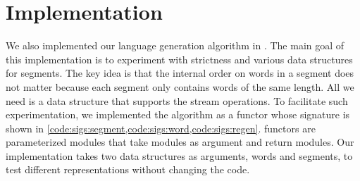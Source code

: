 \section{\ocaml Implementation}
\label{sec:ocaml}

\lstset{language=[Objective]Caml}

We also implemented our
language generation algorithm in \ocaml.
The main goal of this implementation is to experiment with strictness
and various data structures for segments. 
The key idea is that the internal order on words in a segment does not matter
because each segment only contains words of the same length.
All we need is a data structure that supports the stream
operations.
%
To facilitate such experimentation, we implemented the
algorithm as a functor whose signature is shown in
\cref{code:sigs:segment,code:sigs:word,code:sigs:regen}.
\ocaml{} functors are parameterized modules that take modules
as argument and return modules. Our implementation
takes two data structures as arguments, words and segments,
to test different representations without changing
the code.

